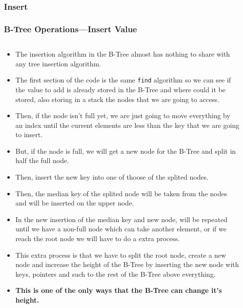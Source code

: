 \begin{frame}
    \subsubsection{Insert}
    \frametitle{B-Tree Operations---Insert Value}
    \begin{columns}
        \begin{column}{\textlecolumn}
            \begin{block}{}
                \begin{itemize}
                    \item The insertion algorithm in the B-Tree almost has nothing to share with any tree insertion algorithm.
                    \item The first section of the code is the same \lstinline|find| algorithm so we can see if the value to add is already 
                        stored in the B-Tree and where could it be stored, also storing in a stack the nodes that we are going to access.
                    \item Then, if the node isn't full yet, we are just going to move everything by an index until the current elements are 
                        less than the key that we are going to insert.
                    \item But, if the node is full, we will get a new node for the B-Tree and split in half the full node.
                    \item Then, insert the new key into one of thoose of the splited nodes.
                    \item Then, the median key of the splited node will be taken from the nodes and will be inserted on the upper node.
                    \item In the new insertion of the median key and new node, will be repeated until we have a non-full node which can 
                        take another element, or if we reach the root node we will have to do a extra process.
                    \item This extra process is that we have to split the root node, create a new node and increase the height of the B-Tree by inserting the new node with 
                        keys, pointers and such to the rest of the B-Tree above everything.
                    \item \textbf{This is one of the only ways that the B-Tree can change it's height.}
                \end{itemize}
            \end{block}
        \end{column}
        \begin{column}{\textricolumn}
        \end{column}
    \end{columns}
    

\end{frame}
